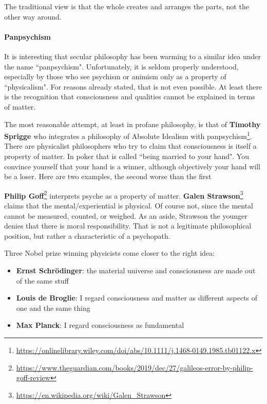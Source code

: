 The traditional view is that the whole creates and arranges the parts, not the other way around.

\paragraph{Panpsychism}
It is interesting that secular philosophy has been warming to a similar idea under the name ``panpsychism". Unfortunately, it is seldom properly understood, especially by those who see psychism or animism only as a property of ``physicalism". For reasons already stated, that is not even possible. At least there is the recognition that consciousness and qualities cannot be explained in terms of matter.

The most reasonable attempt, at least in profane philosophy, is that of \textbf{Timothy Sprigge} who integrates a philosophy of Absolute Idealism with panpsychism\footnote{\url{https://onlinelibrary.wiley.com/doi/abs/10.1111/j.1468-0149.1985.tb01122.x}}. There are physicalist philosophers who try to claim that consciousness is itself a property of matter. In poker that is called ``being married to your hand". You convince yourself that your hand is a winner, although objectively your hand will be a loser. Here are two examples, the second worse than the first

\textbf{Philip Goff}\footnote{\url{https://www.theguardian.com/books/2019/dec/27/galileos-error-by-philip-goff-review}} interprets psyche as a property of matter. \textbf{Galen Strawson}\footnote{\url{https://en.wikipedia.org/wiki/Galen_Strawson}} claims that the mental/experiential is physical. Of course not, since the mental cannot be measured, counted, or weighed. As an aside, Strawson the younger denies that there is moral responsibility. That is not a legitimate philosophical position, but rather a characteristic of a psychopath.

Three Nobel prize winning physicists come closer to the right idea:

\begin{itemize}
\item \textbf{Ernst Schrödinger}: the material universe and consciousness are made out of the same stuff 
\item \textbf{Louis de Broglie}: I regard consciousness and matter as different aspects of one and the same thing 
\item \textbf{Max Planck}: I regard consciousness as fundamental 
\end{itemize}

